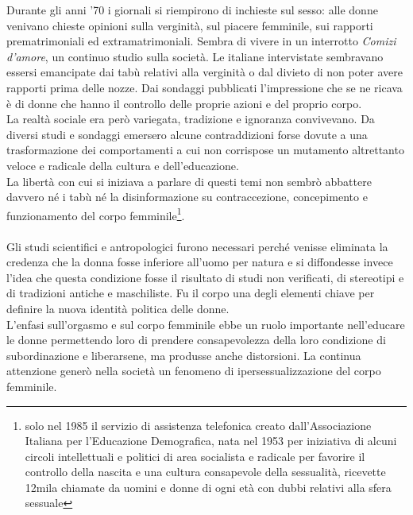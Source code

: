 Durante gli anni '70 i giornali si riempirono di inchieste sul sesso: alle donne venivano chieste opinioni sulla verginità, sul piacere femminile, sui rapporti prematrimoniali ed extramatrimoniali.
Sembra di vivere in un interrotto \textit{Comizi d'amore}, un continuo studio sulla società.
Le italiane intervistate sembravano essersi emancipate dai tabù relativi alla verginità o dal divieto di non poter avere rapporti prima delle nozze.
Dai sondaggi pubblicati l'impressione che se ne ricava è di donne che hanno il controllo delle proprie azioni e del proprio corpo.
\\La realtà sociale era però variegata, tradizione e ignoranza convivevano. 
Da diversi studi e sondaggi emersero alcune contraddizioni forse dovute a una trasformazione dei comportamenti a cui non corrispose un mutamento altrettanto veloce e radicale della cultura e dell'educazione.
\\La libertà con cui si iniziava a parlare di questi temi non sembrò abbattere davvero né i tabù né la disinformazione su contraccezione, concepimento e funzionamento del corpo femminile\footnote{solo nel 1985 il servizio di assistenza telefonica creato dall'Associazione Italiana per l'Educazione Demografica, nata nel 1953 per iniziativa di alcuni circoli intellettuali e politici di area socialista e radicale per favorire il controllo della nascita e una cultura consapevole della sessualità, ricevette 12mila chiamate da uomini e donne di ogni età con dubbi relativi alla sfera sessuale}.

\paragraph{}Gli studi scientifici e antropologici furono necessari perché venisse eliminata la credenza che la donna fosse inferiore all'uomo per natura e si diffondesse invece l'idea che questa condizione fosse il risultato di studi non verificati, di stereotipi e di tradizioni antiche e maschiliste.
Fu il corpo una degli elementi chiave per definire la nuova identità politica delle donne.
\\L'enfasi sull'orgasmo e sul corpo femminile ebbe un ruolo importante nell'educare le donne permettendo loro di prendere consapevolezza della loro condizione di subordinazione e liberarsene, ma produsse anche distorsioni.
La continua attenzione generò nella società un fenomeno di ipersessualizzazione  del corpo femminile.


